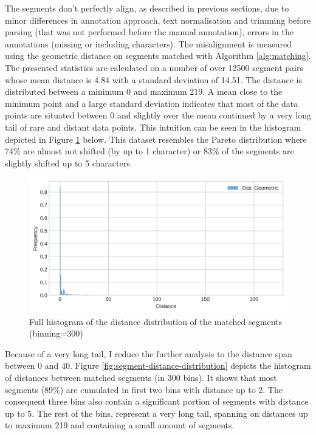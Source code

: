 The segments don't perfectly align, as described in previous sections, due to minor differences in annotation approach, text normalisation and trimming before parsing (that was not performed before the manual annotation), errors in the annotations (missing or including characters). The misalignment is measured using the geometric distance 
on segments matched with Algorithm \ref{alg:matching}. The presented statistics are calculated on a number of over 12500 segment pairs whose mean distance is 4.84 with a standard deviation of 14.51. The distance is distributed between a minimum 0 and maximum 219. A mean close to the minimum point and a large standard deviation indicates that most of the data points are situated between 0 and slightly over the mean continued by a very long tail of rare and distant data points. This intuition can be seen in the histogram depicted in Figure \ref{fig:segment-distance-histogram-full} below. This dataset resembles the Pareto distribution where 74\% are almost not shifted (by up to 1 character) or 83\% of the segments are slightly shifted up to 5 characters.

\begin{figure}[!ht]
    \centering
    \includegraphics[width=.7\textwidth]{evaluation-results/figures/distance-distr-histogram-full}
    \caption{Full histogram of the distance distribution of the matched segments (binning=300)}
    \label{fig:segment-distance-histogram-full}
\end{figure}

Because of a very long tail, I reduce the further analysis to the distance span between 0 and 40. Figure \ref{fig:segment-distance-distribution} depicts the histogram of distances between matched segments (in 300 bins). It shows that most segments (89\%) are cumulated in first two bins with distance up to 2. The consequent three bins also contain a significant portion of segments with distance up to 5. The rest of the bins, represent a very long tail, spanning on distances up to maximum 219 and containing a small amount of segments. 

